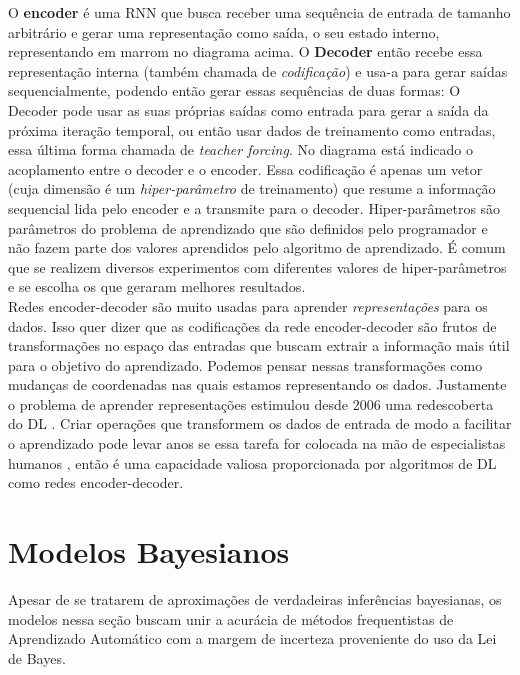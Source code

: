 O \textbf{encoder} é uma RNN que busca receber uma sequência de entrada de
tamanho arbitrário e gerar uma representação como saída, o seu estado interno,
representando em marrom no diagrama acima. O \textbf{Decoder} então recebe essa representação interna (também chamada
de \textit{codificação}) e usa-a para gerar saídas sequencialmente, podendo
então gerar essas sequências de duas formas: O Decoder pode usar as suas próprias saídas
como entrada para gerar a saída da próxima iteração temporal, ou então usar dados de treinamento como
entradas, essa última forma chamada de \textit{teacher forcing}. No diagrama
está indicado o acoplamento entre o decoder e o encoder. Essa codificação é apenas
um vetor (cuja dimensão é um \textit{hiper-parâmetro} de treinamento) que resume a
informação sequencial lida pelo encoder e a transmite para o decoder.
Hiper-parâmetros são parâmetros do problema de aprendizado que são definidos
pelo programador e não fazem parte dos valores aprendidos pelo algoritmo de
aprendizado. É comum que se realizem diversos experimentos com diferentes
valores de hiper-parâmetros e se escolha os que geraram melhores resultados. 
\\

Redes encoder-decoder são muito usadas para aprender \textit{representações} para os
dados. Isso quer dizer que as codificações da rede encoder-decoder são frutos de
transformações no espaço das entradas que buscam extrair a informação mais útil
para o objetivo do aprendizado. Podemos pensar nessas transformações como
mudanças de coordenadas nas quais estamos representando os dados. Justamente o problema de aprender
representações estimulou desde 2006 uma redescoberta do DL \citep{dlbook}. Criar
operações que transformem os dados de entrada de modo a facilitar o aprendizado
pode levar anos se essa tarefa for colocada na mão de especialistas humanos
\citep{dlbook}, então é uma capacidade valiosa proporcionada por algoritmos de
DL como redes encoder-decoder. \\



\section{Modelos Bayesianos}

Apesar de se tratarem de aproximações de verdadeiras inferências bayesianas, os
modelos nessa seção buscam unir a acurácia de métodos frequentistas de
Aprendizado Automático com a margem de incerteza proveniente do uso da Lei de Bayes.

